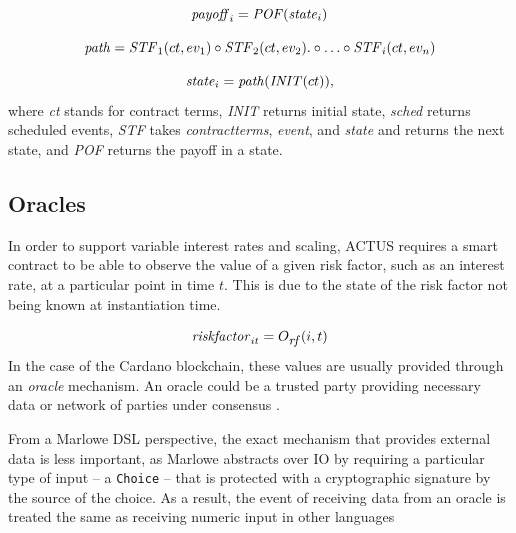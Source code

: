 \documentclass[runningheads]{llncs}
\newcommand{\ident}[1]{\mbox{\emph{#1}}}
\begin{document}
\noindent 
\begin{equation}
\ident{payoff}_{i}=\ident{POF}(\ident{state}_{i})
\end{equation}

\newcommand{\STF}{\ident{STF}}
\noindent 
\begin{equation}
\ident{path}=\STF_{1}(ct,ev_{1})\circ \STF_{2}(ct,ev_{2}).\circ\ldots\circ \STF_{i}(ct,ev_{n})
\end{equation}

\noindent 
\begin{equation}
\ident{state}_{i}=\ident{path}(\ident{INIT}(ct)),
\end{equation}
\noindent
where \emph{ct} stands for contract terms, \emph{INIT} returns initial state, \emph{sched}
returns scheduled events, \emph{STF} takes \emph{contractterms}, \emph{event}, and \emph{state}
and returns the next state, and \emph{POF} returns the payoff in a state.

\subsection{Oracles}

In order to support variable interest rates and scaling, ACTUS requires
a smart contract to be able to observe the value of a given risk factor,
such as an interest rate, at a particular point in time $t$. This is due to the state of the risk factor not being known at instantiation
time. 

\noindent 
\begin{equation}
\ident{riskfactor}_{it}=O_{\footnotesize\ident{rf}}(i,t)
\end{equation}
\noindent
In the case of the Cardano blockchain, these values are usually
provided through an \emph{oracle} mechanism\cite{oracles}. An oracle
could be a trusted party providing necessary data or network of parties
under consensus \cite{de-oracles}. 

From a Marlowe DSL perspective,
the exact mechanism that provides external data is less important,
as Marlowe abstracts over IO by requiring a particular type of input -- a 
\texttt{Choice} -- that is protected with a cryptographic signature by the source of the choice.
As a result, the event of receiving data from an oracle is treated the
same as receiving numeric input in other languages
\end{document}
